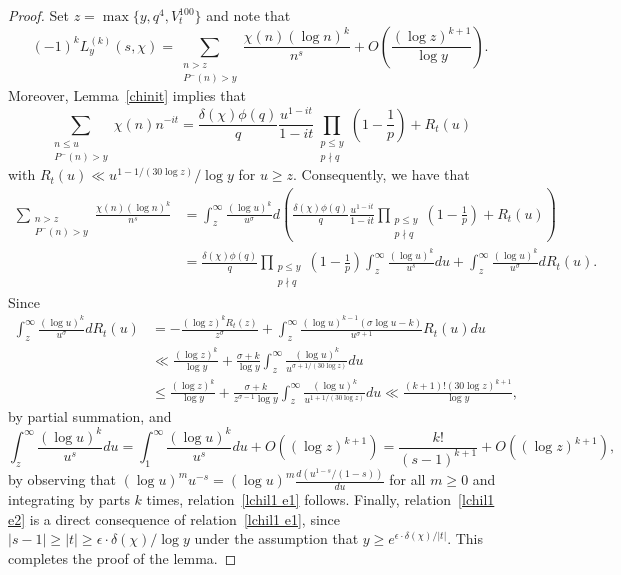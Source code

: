 \documentclass[12pt]{amsart}
\theoremstyle{remark}
\newcommand{\bsp}{\begin{split}}
\newcommand{\bes}{\begin{equation*}}
\newcommand{\ees}{\end{equation*}}
\numberwithin{equation}{section}
\begin{document}
\begin{proof} Set $z=\max\{y,q^4,V_t^{100}\}$ and note that
\bes\label{lchi e1}
(-1)^kL_y^{(k)}(s,\chi) =  \sum_{\substack{n>z\\P^-(n)>y}} \frac{\chi(n)(\log n)^k}{n^s} + O\left(\frac{(\log z)^{k+1}}{\log y}\right).
\ees
Moreover, Lemma~\ref{chinit} implies that
$$
\sum_{\substack{n\le u\\P^-(n)>y}}\chi(n)n^{-it} = \frac{\delta(\chi) \phi(q) }{q} \frac{u^{1-it}} {1-it} \prod_{\substack{p\le y\\p\nmid q}} \left(1-\frac1p\right) +R_t(u)
$$
with $R_t(u)\ll u^{1-1/(30\log z)}/\log y$ for $u\ge z$. Consequently, we have that
\bes\bsp
\sum_{\substack{n>z\\P^-(n)>y}} \frac{\chi(n)(\log n)^k}{n^s}
&= \int_z^\infty \frac{(\log u)^k}{u^\sigma} d\left( \frac{\delta(\chi) \phi(q) }{q} \frac{u^{1-it}} {1-it} \prod_{\substack{p\le y\\p\nmid q}} \left(1-\frac1p\right) + R_t(u)\right) \\
&= \frac{\delta(\chi)\phi(q)}q \prod_{\substack{p\le y\\p\nmid q}}\left(1-\frac1p\right) \int_z^\infty\frac{(\log u)^k}{u^s}du
+\int_z^\infty\frac{(\log u)^k}{u^\sigma}d R_t(u).
\end{split}\ees
Since
\bes\bsp
\int_z^\infty\frac{(\log u)^k}{u^\sigma}d R_t(u) &= -\frac{(\log z)^kR_t(z)}{z^\sigma} + \int_z^\infty \frac{(\log u)^{k-1}(\sigma\log u-k)}{u^{\sigma+1}}R_t(u)du \\
&\ll\frac{(\log z)^k}{\log y}+\frac{\sigma+k}{\log y}\int_z^\infty\frac{(\log u)^k}{u^{\sigma+1/(30\log z)}}du\\
&\le\frac{(\log z)^k}{\log y}+\frac{\sigma+k}{z^{\sigma-1}\log y}\int_z^\infty\frac{(\log u)^k}{u^{1+1/(30\log z)}}du
	\ll \frac{ (k+1)!(30\log z)^{k+1} }{\log y},
\end{split}\ees
by partial summation, and
$$
\int_z^\infty\frac{(\log u)^k}{u^s}du=\int_1^\infty\frac{(\log u)^k}{u^s}du+O((\log z)^{k+1})=\frac{k!}{(s-1)^{k+1}}+O((\log z)^{k+1}),
$$
by observing that $(\log u)^mu^{-s}=(\log u)^m\frac{d(u^{1-s}/(1-s))}{du}$ for all $m\ge0$ and integrating by parts $k$ times, relation~\eqref{lchil1 e1} follows. Finally, relation~\eqref{lchil1 e2} is a direct consequence of relation~\eqref{lchil1 e1}, since $|s-1|\ge|t|\ge\epsilon\cdot\delta(\chi)/\log y$ under the assumption that $y\ge e^{\epsilon\cdot\delta(\chi)/|t|}$. This completes the proof of the lemma.
\end{proof}
\end{document}
